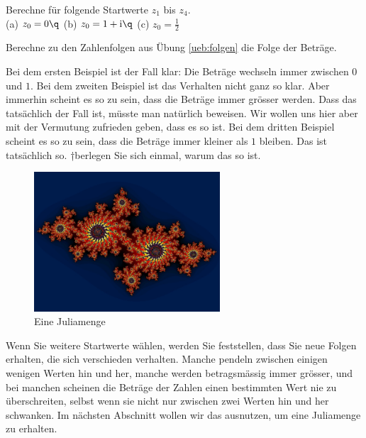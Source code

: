 \documentclass[%
11pt,%
twoside,%
titlepage,%
german,%
headsepline%
]{scrartcl}
\begin{document}
\begin{ueb}[Startwerte]\label{ueb:folgen}
Berechne f\"ur folgende Startwerte $z_1$ bis $z_4$.\\

(a) $z_0=0\q$ (b) $z_0=1+\mathrm{i}\q$ (c) $z_0=\frac{1}{2}$
\end{ueb}

\begin{ueb}[Beträge]
Berechne zu den Zahlenfolgen aus Übung \ref{ueb:folgen} die Folge der Beträge.
\end{ueb}

Bei dem ersten Beispiel ist der Fall klar: Die Beträge wechseln immer zwischen $0$ und $1$. Bei dem zweiten Beispiel ist das Verhalten nicht ganz so klar. Aber immerhin scheint es so zu sein, dass die Beträge immer gr\"osser werden. Dass das tatsächlich der Fall ist, m\"usste man nat\"urlich beweisen. Wir wollen uns hier aber mit der Vermutung zufrieden geben, dass es so ist. Bei dem dritten Beispiel scheint es so zu sein, dass die Beträge immer kleiner als $1$ bleiben. Das ist tatsächlich so. †berlegen Sie sich einmal, warum das so ist.

\begin{figure}
\begin{center}
\includegraphics[width=0.618\textwidth]{pictures/julia1}
\end{center}
\caption{Eine Juliamenge}
\end{figure}

Wenn Sie weitere Startwerte wählen, werden Sie feststellen, dass Sie neue Folgen erhalten, die sich verschieden verhalten. Manche pendeln zwischen einigen wenigen Werten hin und her, manche werden betragsmässig immer gr\"osser, und bei manchen scheinen die Beträge der Zahlen einen bestimmten Wert nie zu \"uberschreiten, selbst wenn sie nicht nur zwischen zwei Werten hin und her schwanken. Im nächsten Abschnitt wollen wir das ausnutzen, um eine Juliamenge zu erhalten.
\end{document}
